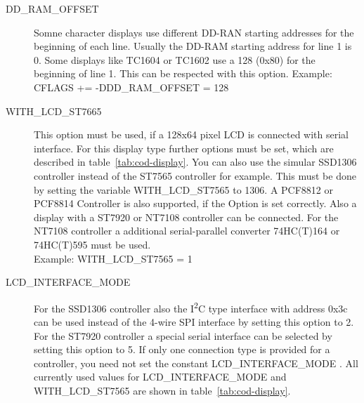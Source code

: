\begin{description}
  \item[DD\_RAM\_OFFSET] Somne character displays use different DD-RAN starting addresses for the beginning of each line.
Usually the DD-RAM starting address for line 1 is 0.
Some displays like TC1604 or TC1602 use a 128 (0x80) for the beginning of line 1.
This can be respected with this option.
Example: CFLAGS += -DDD\_RAM\_OFFSET = 128

  \item[WITH\_LCD\_ST7665] This option must be used, if a 128x64 pixel LCD is connected with serial
interface. For this display type further options must be set, which are described in table~\ref{tab:cod-display}.
You can also use the simular SSD1306 controller instead of the ST7565 controller for example.
This must be done by setting the variable WITH\_LCD\_ST7565 to 1306.
A PCF8812 or PCF8814 Controller is also supported, if the Option is set correctly.
Also a display with a ST7920 or NT7108 controller can be connected.
For the NT7108 controller a additional serial-parallel converter 74HC(T)164 or 74HC(T)595 must be used.  \\
Example: WITH\_LCD\_ST7565 = 1 

 \item[LCD\_INTERFACE\_MODE] For the SSD1306 controller also the I\textsuperscript{2}C type interface with address 0x3c
can be used  instead of the 4-wire SPI interface by setting this option to 2.
For the ST7920 controller a special serial interface can be selected by setting this option to 5.
If only one connection type is provided for a controller, you need not set the constant LCD\_INTERFACE\_MODE .
All currently used values for LCD\_INTERFACE\_MODE and WITH\_LCD\_ST7565 are shown in table~\ref{tab:cod-display}. \\


\end{description}
